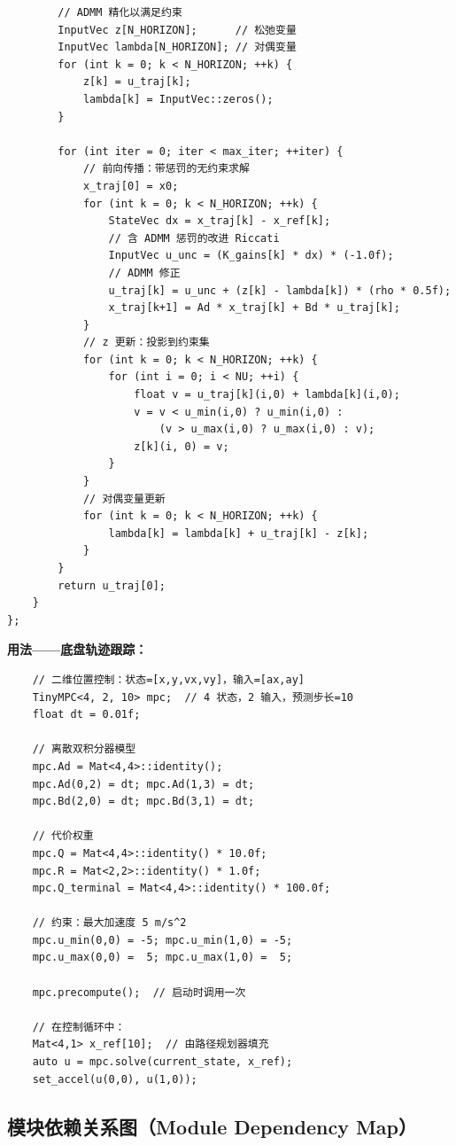 \begin{verbatim}
        // ADMM 精化以满足约束
        InputVec z[N_HORIZON];      // 松弛变量
        InputVec lambda[N_HORIZON]; // 对偶变量
        for (int k = 0; k < N_HORIZON; ++k) {
            z[k] = u_traj[k];
            lambda[k] = InputVec::zeros();
        }

        for (int iter = 0; iter < max_iter; ++iter) {
            // 前向传播：带惩罚的无约束求解
            x_traj[0] = x0;
            for (int k = 0; k < N_HORIZON; ++k) {
                StateVec dx = x_traj[k] - x_ref[k];
                // 含 ADMM 惩罚的改进 Riccati
                InputVec u_unc = (K_gains[k] * dx) * (-1.0f);
                // ADMM 修正
                u_traj[k] = u_unc + (z[k] - lambda[k]) * (rho * 0.5f);
                x_traj[k+1] = Ad * x_traj[k] + Bd * u_traj[k];
            }
            // z 更新：投影到约束集
            for (int k = 0; k < N_HORIZON; ++k) {
                for (int i = 0; i < NU; ++i) {
                    float v = u_traj[k](i,0) + lambda[k](i,0);
                    v = v < u_min(i,0) ? u_min(i,0) :
                        (v > u_max(i,0) ? u_max(i,0) : v);
                    z[k](i, 0) = v;
                }
            }
            // 对偶变量更新
            for (int k = 0; k < N_HORIZON; ++k) {
                lambda[k] = lambda[k] + u_traj[k] - z[k];
            }
        }
        return u_traj[0];
    }
};
\end{verbatim}

\textbf{用法——底盘轨迹跟踪：}
\begin{verbatim}
    // 二维位置控制：状态=[x,y,vx,vy]，输入=[ax,ay]
    TinyMPC<4, 2, 10> mpc;  // 4 状态，2 输入，预测步长=10
    float dt = 0.01f;

    // 离散双积分器模型
    mpc.Ad = Mat<4,4>::identity();
    mpc.Ad(0,2) = dt; mpc.Ad(1,3) = dt;
    mpc.Bd(2,0) = dt; mpc.Bd(3,1) = dt;

    // 代价权重
    mpc.Q = Mat<4,4>::identity() * 10.0f;
    mpc.R = Mat<2,2>::identity() * 1.0f;
    mpc.Q_terminal = Mat<4,4>::identity() * 100.0f;

    // 约束：最大加速度 5 m/s^2
    mpc.u_min(0,0) = -5; mpc.u_min(1,0) = -5;
    mpc.u_max(0,0) =  5; mpc.u_max(1,0) =  5;

    mpc.precompute();  // 启动时调用一次

    // 在控制循环中：
    Mat<4,1> x_ref[10];  // 由路径规划器填充
    auto u = mpc.solve(current_state, x_ref);
    set_accel(u(0,0), u(1,0));
\end{verbatim}

\subsection{模块依赖关系图（Module Dependency Map）}

